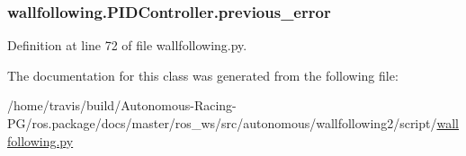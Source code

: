\subsubsection[{\texorpdfstring{previous\+\_\+error}{previous_error}}]{\setlength{\rightskip}{0pt plus 5cm}wallfollowing.\+P\+I\+D\+Controller.\+previous\+\_\+error}\hypertarget{classwallfollowing_1_1_p_i_d_controller_a8f880f52e6d6f020769ab01d6459c908}{}\label{classwallfollowing_1_1_p_i_d_controller_a8f880f52e6d6f020769ab01d6459c908}


Definition at line 72 of file wallfollowing.\+py.



The documentation for this class was generated from the following file\+:\begin{DoxyCompactItemize}
\item 
/home/travis/build/\+Autonomous-\/\+Racing-\/\+P\+G/ros.\+package/docs/master/ros\+\_\+ws/src/autonomous/wallfollowing2/script/\hyperlink{wallfollowing_8py}{wallfollowing.\+py}\end{DoxyCompactItemize}
